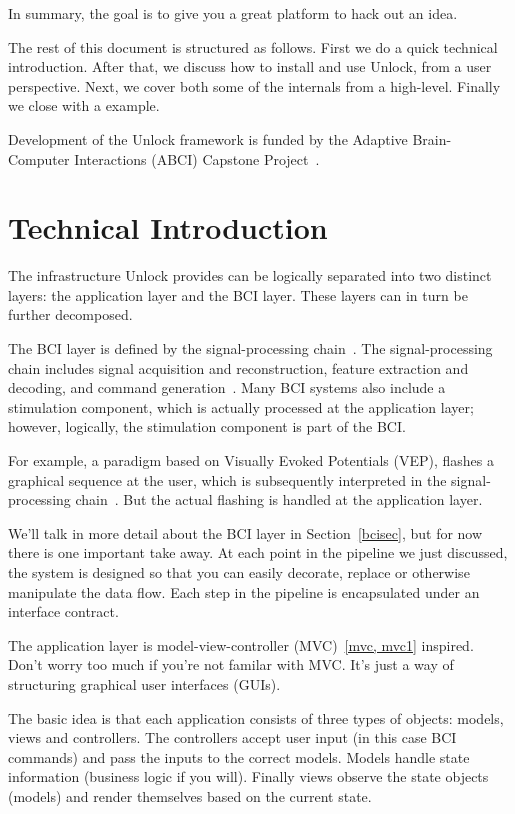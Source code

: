 \documentclass[11pt]{article}
\begin{document}
In summary, the goal is to give you a great platform to hack out an idea.

The rest of this document is structured as follows.  %
First we do a quick technical introduction.  After that, we discuss how to install and use Unlock, from a user perspective.  Next, we cover both some of the internals from a high-level.  Finally we close with a example.

Development of the Unlock framework is funded by the Adaptive Brain-Computer Interactions (ABCI) Capstone Project~\cite{abci}.

\section{Technical Introduction}

The infrastructure Unlock provides can be logically separated into two distinct layers: the application layer and the BCI layer.  These layers can in turn be further decomposed.

 The BCI layer is defined by the signal-processing chain~\cite{signalprocessing}.  The signal-processing chain includes signal acquisition and reconstruction, feature extraction and decoding, and command generation~\cite{neuraleng}.  Many BCI systems also include a stimulation component, which is actually processed at the application layer; however, logically, the stimulation component is part of the BCI.

For example, a paradigm based on Visually Evoked Potentials (VEP), flashes a graphical sequence at the user, which is subsequently interpreted in the signal-processing chain~\cite{vep}.  But the actual flashing is handled at the application layer.

We'll talk in more detail about the BCI layer in Section~\ref{bcisec}, but for now there is one important take away.  At each point in the pipeline we just discussed, the system is designed so that you can easily decorate, replace or otherwise manipulate the data flow.  Each step in the pipeline is encapsulated under an interface contract.

The application layer is model-view-controller (MVC)~\ref{mvc, mvc1} inspired.  Don't worry too much if you're not familar with MVC.  It's just a way of structuring graphical user interfaces (GUIs).  

The basic idea is that each application consists of three types of objects: models, views and controllers.  The controllers accept user input (in this case BCI commands) and pass the inputs to the correct models.  Models handle state information (business logic if you will).  Finally views observe the state objects (models) and render themselves based on the current state.
\end{document}
